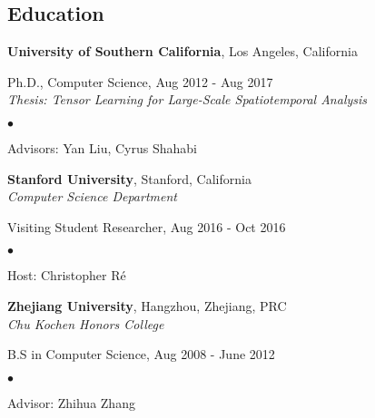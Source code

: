 \documentclass[margin,line]{res}
\newenvironment{list1}{
  \begin{list}{\ding{113}}{%
      \setlength{\itemsep}{0in}
      \setlength{\parsep}{0in} \setlength{\parskip}{0in}
      \setlength{\topsep}{0in} \setlength{\partopsep}{0in} 
      \setlength{\leftmargin}{0.17in}}}{\end{list}}
\newenvironment{list2}{
  \begin{list}{$\bullet$}{%
      \setlength{\itemsep}{0in}
      \setlength{\parsep}{0in} \setlength{\parskip}{0in}
      \setlength{\topsep}{0in} \setlength{\partopsep}{0in} 
      \setlength{\leftmargin}{0.2in}}}{\end{list}}
\begin{document}
\begin{resume}
\section{\sc Education}
{\bf University of Southern California}, Los Angeles, California
\begin{list1}
\item[] Ph.D., Computer Science, Aug 2012 - Aug 2017 \\
{\em Thesis: Tensor Learning for Large-Scale Spatiotemporal Analysis} 
\begin{list2}
\vspace*{.05in}
\item Advisors:  Yan Liu, Cyrus Shahabi
\end{list2}
\vspace*{.05in}
\end{list1}


{\bf Stanford University}, Stanford, California\\
{\em Computer Science Department } 
\begin{list1}
	\item[] Visiting Student Researcher, Aug 2016 - Oct 2016
	\begin{list2}
		\vspace*{.05in}
		\item Host:  Christopher R\'e
	\end{list2}
\end{list1}

{\bf Zhejiang University}, Hangzhou, Zhejiang, PRC\\
{\em Chu Kochen Honors College} 
\begin{list1}
\item[] B.S in Computer Science, Aug 2008 - June 2012 %
\begin{list2}
\vspace*{.05in}
\item Advisor:  Zhihua Zhang
\end{list2}
\end{list1}





\end{resume}
\end{document}
